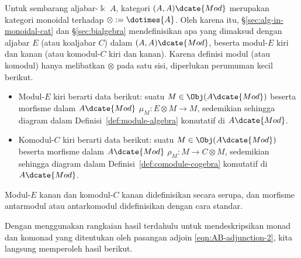 \begin{definition}\label{def:cogebroid}
	 
	Untuk sembarang aljabar-$\Bbbk$ $A$, kategori
	$(A,A)\dcate{Mod}$ merupakan kategori monoidal terhadap
	$\otimes:=\dotimes{A}$. Oleh karena itu, \S\ref{sec:alg-in-monoidal-cat}
	dan \S\ref{sec:bialgebra} mendefinisikan apa yang dimaksud dengan aljabar
	$E$ (atau koaljabar $C$) dalam $(A,A)\dcate{Mod}$, beserta modul-$E$ kiri
	dan kanan (atau komodul-$C$ kiri dan kanan). Karena definisi
	modul (atau komodul) hanya melibatkan $\otimes$ pada satu sisi, diperlukan
	perumuman kecil berikut.
	\begin{itemize}
		\item Modul-$E$ kiri berarti data berikut: suatu
		$M\in\Obj(A\dcate{Mod})$ beserta morfisme dalam $A\dcate{Mod}$
		$\mu_M:E\otimes M\to M$, sedemikian sehingga diagram dalam
		Definisi~\ref{def:module-algebra} komutatif di $A\dcate{Mod}$.

		\item Komodul-$C$ kiri berarti data berikut: suatu
		$M\in\Obj(A\dcate{Mod})$ beserta morfisme dalam $A\dcate{Mod}$
		$\rho_M:M\to C\otimes M$, sedemikian sehingga diagram dalam
		Definisi~\ref{def:comodule-cogebra} komutatif di $A\dcate{Mod}$.
	\end{itemize}
	Modul-$E$ kanan dan komodul-$C$ kanan didefinisikan secara serupa, dan
	morfisme antarmodul atau antarkomodul didefinisikan dengan cara standar.
\end{definition}

Dengan menggunakan rangkaian hasil terdahulu untuk mendeskripsikan monad dan
komonad yang ditentukan oleh pasangan adjoin \eqref{eqn:AB-adjunction-2}, kita
langsung memperoleh hasil berikut.

